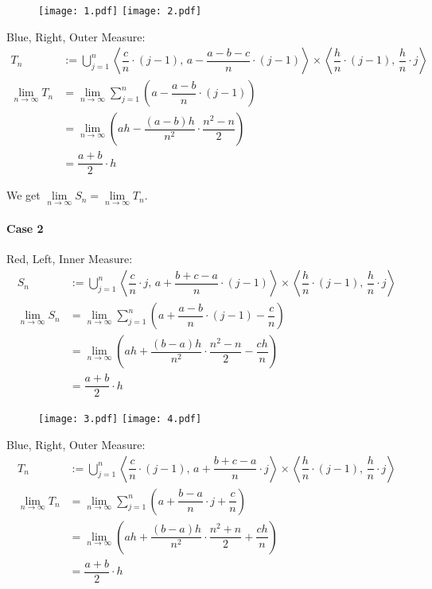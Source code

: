\documentclass[11pt]{article}
\def\to{\rightarrow}
\begin{document}
\begin{figure}[H]
\centering
\texttt{[image: 1.pdf]}
\hfill
\texttt{[image: 2.pdf]}
\end{figure}

Blue, Right, Outer Measure:
$$\begin{aligned}
T_n &:= \bigcup_{j=1}^n \left< \dfrac{c}{n} \cdot (j-1) ,\, a - \dfrac{a-b-c}{n} \cdot (j-1) \right> \times \left< \dfrac{h}{n} \cdot (j-1) ,\, \dfrac{h}{n} \cdot j \right> \\
\lim\limits_{n\to\infty} T_n &= \lim\limits_{n\to\infty} \sum_{j=1}^n \left( a - \dfrac{a-b}{n} \cdot (j-1) \right) \\
&= \lim\limits_{n\to\infty} \left( ah - \dfrac{(a-b)h}{n^2} \cdot \dfrac{n^2-n}{2} \right) \\
&= \dfrac{a+b}{2} \cdot h
\end{aligned}$$

We get $\lim\limits_{n\to\infty} S_n = \lim\limits_{n\to\infty} T_n$.

\paragraph{Case 2}

Red, Left, Inner Measure:
$$\begin{aligned}
S_n &:= \bigcup_{j=1}^n \left< \dfrac{c}{n} \cdot j ,\, a + \dfrac{b+c-a}{n} \cdot (j-1) \right> \times \left< \dfrac{h}{n} \cdot (j-1) ,\, \dfrac{h}{n} \cdot j \right> \\
\lim\limits_{n\to\infty} S_n &= \lim\limits_{n\to\infty} \sum_{j=1}^n \left( a + \dfrac{a-b}{n} \cdot (j-1) - \dfrac{c}{n} \right) \\
&= \lim\limits_{n\to\infty} \left( ah + \dfrac{(b-a)h}{n^2} \cdot \dfrac{n^2-n}{2} -\dfrac{ch}{n} \right) \\
&= \dfrac{a+b}{2} \cdot h
\end{aligned}$$

\begin{figure}[H]
\centering
\texttt{[image: 3.pdf]}
\hfill
\texttt{[image: 4.pdf]}
\end{figure}

Blue, Right, Outer Measure:
$$\begin{aligned}
T_n &:= \bigcup_{j=1}^n \left< \dfrac{c}{n} \cdot (j-1) ,\, a + \dfrac{b+c-a}{n} \cdot j \right> \times \left< \dfrac{h}{n} \cdot (j-1) ,\, \dfrac{h}{n} \cdot j \right> \\
\lim\limits_{n\to\infty} T_n &= \lim\limits_{n\to\infty} \sum_{j=1}^n \left( a + \dfrac{b-a}{n} \cdot j +\dfrac{c}{n} \right) \\
&= \lim\limits_{n\to\infty} \left( ah + \dfrac{(b-a)h}{n^2} \cdot \dfrac{n^2+n}{2} + \dfrac{ch}{n} \right) \\
&= \dfrac{a+b}{2} \cdot h
\end{aligned}$$
\end{document}

